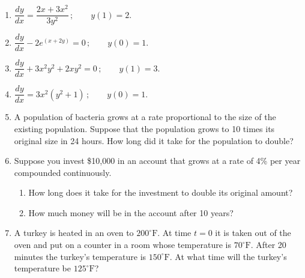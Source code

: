 \documentclass[10pt]{article}
\begin{document}
\begin{enumerate}[leftmargin=*, label=\numbox{\arabic*}, resume]

\item
    \begin{problem}[5cm]
        \(\dfrac{dy}{dx} = \dfrac{2x + 3x^2}{3y^2}\,; \qquad y(1) = 2.\)
    \end{problem}

\item
    \begin{problem}[5cm]
        \(\dfrac{dy}{dx} - 2e^{(x + 2y)} = 0\,; \qquad y(0) = 1.\)
    \end{problem}

\item
    \begin{problem}[5cm]
        \(\dfrac{dy}{dx} + 3x^2 y^2 + 2xy^2 = 0\,; \qquad y(1) = 3.\)
    \end{problem}

\item
    \begin{problem}[5cm]
        \(\dfrac{dy}{dx} = 3x^2 (y^2 + 1)\,; \qquad y(0) = 1.\)
    \end{problem}

\item
    \begin{problem}[5cm]
        A population of bacteria grows at a rate proportional to the size of the
        existing population. Suppose that the population grows to 10 times its
        original size in 24 hours. How long did it take for the population to double?
    \end{problem}

\item
    \begin{problem}[5cm]
        Suppose you invest \$10{,}000 in an account that grows at a rate of 4\% per
        year compounded continuously.
        \begin{enumerate}[label=(\alph*)]
            \item How long does it take for the investment to double its original amount?
            \item How much money will be in the account after 10 years?
        \end{enumerate}
    \end{problem}

\item
    \begin{problem}[5cm]
        A turkey is heated in an oven to \(200^\circ\mathrm{F}\). At time \(t = 0\) it
        is taken out of the oven and put on a counter in a room whose temperature is
        \(70^\circ\mathrm{F}\). After 20 minutes the turkey's temperature is
        \(150^\circ\mathrm{F}\). At what time will the turkey's temperature be
        \(125^\circ\mathrm{F}\)?
    \end{problem}

\end{enumerate}
\end{document}
